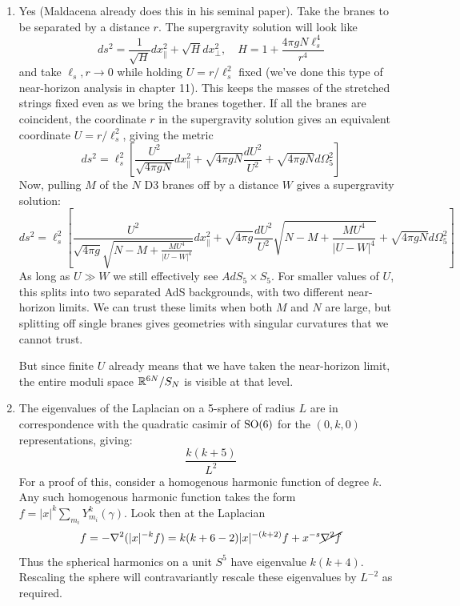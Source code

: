 \documentclass[11pt, class=article, crop=false]{standalone}
\begin{document}
\begin{enumerate}
	\item Yes (Maldacena already does this in his seminal paper). Take the branes to be separated by a distance $r$. The supergravity solution will look like
	\[
		ds^2 = \frac{1}{\sqrt{H}} dx_{\parallel}^2 + \sqrt{H} dx_\perp^2, \quad H = 1 + \frac{4 \pi g N \ell_s^4}{r^4}
	\]
	and take $\ell_s, r \to 0$ while holding $U = r/\ell_s^2$ fixed (we've done this type of near-horizon analysis in chapter 11). This keeps the masses of the stretched strings fixed even as we bring the branes together. If all the branes are coincident, the coordinate $r$ in the supergravity solution gives an equivalent coordinate $U = r/\ell_s^2$, giving the metric
	\[
		ds^2 = \ell_s^2 \left[ \frac{U^2}{\sqrt{4 \pi g N}} dx_\parallel^2 + \sqrt{4 \pi g N} \frac{dU^2}{U^2} + \sqrt{4 \pi g N} d\Omega_5^2 \right]
	\]
	Now, pulling $M$ of the $N$ D3 branes off by a distance $W$ gives a supergravity solution:
	\[
			ds^2 = \ell_s^2 \left[ \frac{U^2}{\sqrt{4 \pi g} \sqrt{N - M + \frac{M U^4}{|U - W|^4}}} dx_\parallel^2 + \sqrt{4 \pi g} \frac{dU^2}{U^2} \sqrt{N - M + \frac{M U^4}{|U - W|^4}} + \sqrt{4 \pi g N} d\Omega_5^2 \right]
	\]
	As long as $U \gg W$ we still effectively see $AdS_5 \times S_5$. For smaller values of $U$, this splits into two separated AdS backgrounds, with two different near-horizon limits. We can trust these limits when both $M$ and $N$ are large, but splitting off single branes gives geometries with singular curvatures that we cannot trust. 
	
	But since finite $U$ already means that we have taken the near-horizon limit, the entire moduli space $\mathbb{R}^{6N}/S_N$ is visible at that level.
	
	\item The eigenvalues of the Laplacian on a 5-sphere of radius $L$ are in correspondence with the quadratic casimir of $\mathrm{SO}(6)$ for the $(0, k, 0)$ representations, giving:
	\[
		\frac{k(k+5)}{L^2}
	\]
	For a proof of this, consider a homogenous harmonic function of degree $k$. Any such homogenous harmonic function takes the form $f = |x|^{k} \sum_{m_i} Y^k_{m_i}(\gamma)$. Look then at the Laplacian
	\[
		f = -\nabla^2 (|x|^{-k} f) = k (k + 6 - 2) |x|^{-(k+2)} f + x^{-s} \cancel{\nabla^2 f}
	\]
	Thus the spherical harmonics on a unit $S^5$ have eigenvalue $k(k+4)$. Rescaling the sphere will contravariantly rescale these eigenvalues by $L^{-2}$ as required.
	

\end{enumerate}
\end{document}

